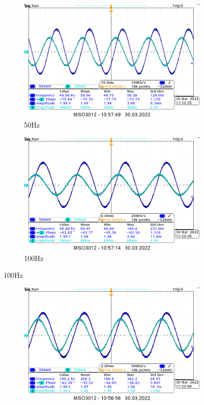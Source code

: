 \begin{itemize}
\begin{figure}[H]
\begin{subfigure}[h]{0.4\textwidth}
                \includegraphics[width=\textwidth]{img_osciloscope/CLR/CLR_50Hz_cropped.png}
                \caption*{50Hz}
            \end{subfigure}
            \begin{subfigure}[h]{0.4\textwidth}
                \includegraphics[width=\textwidth]{img_osciloscope/CLR/CLR_100Hz_cropped.png}
                \caption*{100Hz}
            \end{subfigure}
        \end{figure}
        \begin{figure}[H]
            \centering
            \begin{subfigure}[h]{0.4\textwidth}
                \includegraphics[width=\textwidth]{img_osciloscope/CLR/CLR_200Hz_cropped.png}

\end{subfigure}
\end{figure}
\end{itemize}
